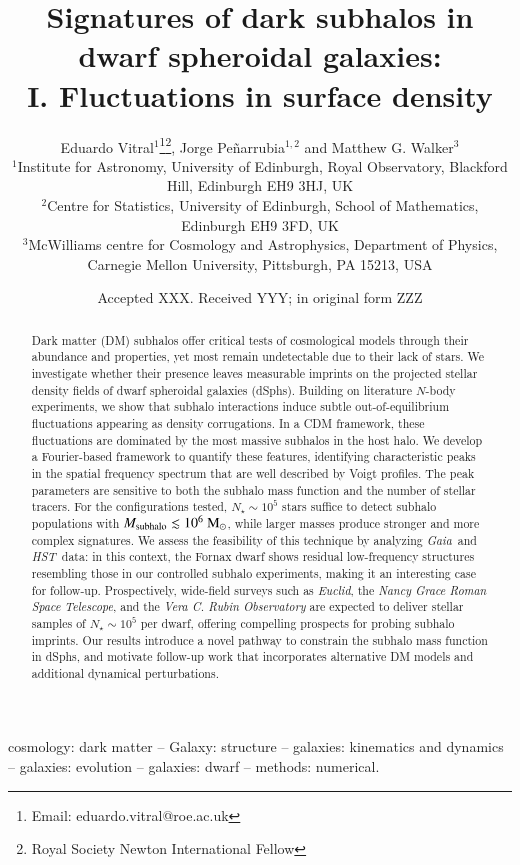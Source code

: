 \documentclass[fleqn,usenatbib]{mnras}
\title[Signatures of dark matter subhalos]{Signatures of dark subhalos in dwarf spheroidal galaxies: \\ I. Fluctuations in surface density}
\author[Vitral et al.]{Eduardo Vitral$^{1}$\thanks{Email: eduardo.vitral@roe.ac.uk}\thanks{Royal Society Newton International Fellow},
Jorge Pe\~narrubia$^{1,2}$ and
Matthew G. Walker$^{3}$
\\
$^1$Institute for Astronomy, University of Edinburgh, Royal Observatory, Blackford Hill, Edinburgh EH9 3HJ, UK\\
$^2$Centre for Statistics, University of Edinburgh, School of Mathematics, Edinburgh EH9 3FD, UK\\
$^3$McWilliams centre for Cosmology and Astrophysics, Department of Physics, Carnegie Mellon University, Pittsburgh, PA 15213, USA\\
}
\date{Accepted XXX. Received YYY; in original form ZZZ}
\newcommand{\gaia}{{\sl Gaia}}
\newcommand{\hst}{{\sl HST}}
\newcommand{\msun}{\rm M_\odot}
\begin{document}
\label{firstpage}
\pagerange{\pageref{firstpage}--\pageref{lastpage}}
\maketitle

\begin{abstract}
Dark matter (DM) subhalos offer critical tests of cosmological models through their abundance and properties, yet most remain undetectable due to their lack of stars. We investigate whether their presence leaves measurable imprints on the projected stellar density fields of dwarf spheroidal galaxies (dSphs). Building on literature $N$-body experiments, we show that subhalo interactions induce subtle out-of-equilibrium fluctuations appearing as density corrugations. In a CDM framework, these fluctuations are dominated by the most massive subhalos in the host halo.
We develop a Fourier-based framework to quantify these features, identifying characteristic peaks in the spatial frequency spectrum that are well described by Voigt profiles. The peak parameters are sensitive to both the subhalo mass function and the number of stellar tracers. For the configurations tested, $N_{\star} \sim 10^5$ stars suffice to detect subhalo populations with $M_{\rm subhalo} \lesssim 10^6~\msun$, while larger masses produce stronger and more complex signatures.
We assess the feasibility of this technique by analyzing \gaia\ and \hst\ data: 
in this context, the Fornax dwarf shows residual low-frequency structures resembling those in our controlled subhalo experiments, making it an interesting case for follow-up.
Prospectively, wide-field surveys such as \textit{Euclid}, the \textit{Nancy Grace Roman Space Telescope}, and the \textit{Vera C. Rubin Observatory} are expected to deliver stellar samples of $N_{\star} \sim 10^5$ per dwarf, offering compelling prospects for probing subhalo imprints. Our results introduce a novel pathway to constrain the subhalo mass function in dSphs, and motivate follow-up work that incorporates alternative DM models and additional dynamical perturbations.
\end{abstract}
\begin{keywords}
cosmology: dark matter -- Galaxy: structure -- galaxies: kinematics and dynamics -- galaxies: evolution -- galaxies: dwarf -- methods: numerical.
\end{keywords}
\end{document}
